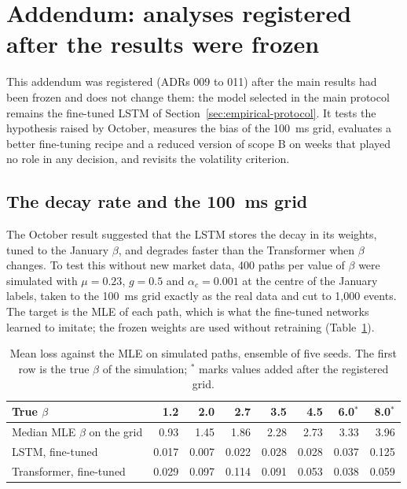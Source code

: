 \section{Addendum: analyses registered after the results were frozen}
\label{sec:addendum}

This addendum was registered (ADRs 009 to 011) after the main results had been frozen and
does not change them: the model selected in the main protocol remains the fine-tuned LSTM of
Section~\ref{sec:empirical-protocol}. It tests the hypothesis raised by October, measures the
bias of the 100~ms grid, evaluates a better fine-tuning recipe and a reduced version of scope
B on weeks that played no role in any decision, and revisits the volatility criterion.


\subsection{The decay rate and the 100~ms grid}
\label{sec:addendum-beta}

The October result suggested that the LSTM stores the decay in its weights, tuned to the
January $\beta$, and degrades faster than the Transformer when $\beta$ changes. To test this
without new market data, 400 paths per value of $\beta$
were simulated with $\mu=0.23$, $g=0.5$
and $\alpha_c=0.001$ at the centre of the January labels, taken to
the 100~ms grid exactly as the real data and cut to 1,000 events. The target is the MLE of
each path, which is what the fine-tuned networks learned to imitate; the frozen weights are
used without retraining (Table~\ref{tab:addendum-beta}).

\begin{table}[htbp]
\centering
\caption{Mean loss against the MLE on simulated paths, ensemble of five seeds. The first
row is the true $\beta$ of the simulation; $^{\ast}$ marks values added after the
registered grid.}
\label{tab:addendum-beta}
\small
\begin{tabular}{lrrrrrrr}
\toprule
True $\beta$ & 1.2 & 2.0 & 2.7 & 3.5 & 4.5 & 6.0$^{\ast}$ & 8.0$^{\ast}$ \\
\midrule
Median MLE $\beta$ on the grid & 0.93 & 1.45 & 1.86 & 2.28 & 2.73 & 3.33 & 3.96 \\
LSTM, fine-tuned & 0.017 & 0.007 & 0.022 & 0.028 & 0.028 & 0.037 & 0.125 \\
Transformer, fine-tuned & 0.029 & 0.097 & 0.114 & 0.091 & 0.053 & 0.038 & 0.059 \\
\bottomrule
\end{tabular}
\end{table}

